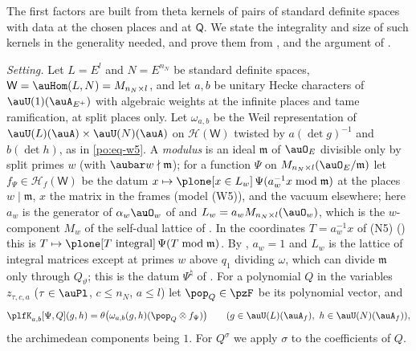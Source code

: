 \documentclass[10pt]{amsart}
\theoremstyle{definition}
\theoremstyle{remark}
\providecommand{\psHS}{\mathcal H}
\begin{document}
The first factors are built from theta kernels of pairs of standard definite spaces with data at
the chosen places and at $\mathsf Q$. We state the integrality and size of such kernels in the
generality needed, and prove them from {\cite[Theorem~7.15]{P49}}, {\cite[Lemma~5.7]{P49}} and the argument of
{\cite[\S5.1.5]{P49}}.

\emph{Setting.} Let $L=E^{l}$ and $N=E^{n_N}$ be standard definite spaces, $\mathsf W=\auHom(L,N)=
M_{n_N\times l}$, and let $a,b$ be unitary Hecke characters of $\auU(1)(\auA_{E^+})$ with
algebraic weights at the infinite places and tame ramification, at split places only. Let
$\omega_{a,b}$ be the Weil representation of $\auU(L)(\auA)\times\auU(N)(\auA)$ on $\psHS(\mathsf W)$
twisted by $a(\det g)^{-1}$ and $b(\det h)$, as in \eqref{po:eq-w5}. A \emph{modulus} is an ideal
$\mathfrak m$ of $\auO_E$ divisible only by split primes $w$ (with $\aubar w\nmid\mathfrak m$); for a
function $\Psi$ on $M_{n_N\times l}(\auO_E/\mathfrak m)$ let $f_\Psi\in\psHS_f(\mathsf W)$ be the
datum $x\mapsto\plone[x\in L_w]\,\Psi(a_w^{-1}x\bmod\mathfrak m)$ at the places $w\mid\mathfrak m$,
$x$ the matrix in the frames (model (W5)), and the vacuum elsewhere; here $a_w$ is the generator of
$\alpha_w\auO_w$ of {\cite[Definition~6.31]{P53}} and $L_w=a_wM_{n_N\times l}(\auO_w)$, which is the
$w$-component $M_w$ of the self-dual lattice of {\cite[Lemma~6.30]{P53}}. In the coordinates $T=a_w^{-1}x$ of
(N5) ({\cite[Lemma~6.32(c)]{P53}}) this is $T\mapsto\plone[T\ \text{integral}]\,\Psi(T\bmod\mathfrak m)$. By {\cite[Proposition~6.9]{P53}}, $a_w=1$ and $L_w$ is the
lattice of integral matrices except at primes $w$ above $q_1$ dividing $\omega$, which can divide
$\mathfrak m$ only through $Q_\vartheta$; this is the datum $\Psi^\natural$ of {\cite[\S2.3]{P53}}. For a polynomial $Q$ in the variables
$z_{\tau,c,a}$ ($\tau\in\auPl$, $c\le n_N$, $a\le l$) let $\pop_Q\in\pzF$ be its polynomial vector,
and
\[
\plfK_{a,b}[\Psi,Q](g,h)=\theta\bigl(\omega_{a,b}(g,h)(\pop_Q\otimes f_\Psi)\bigr)\qquad(g\in\auU(L)(\auA_f),\
h\in\auU(N)(\auA_f)),
\]
the archimedean components being $1$. For $Q^\sigma$ we apply $\sigma$ to the coefficients of $Q$.
\end{document}
